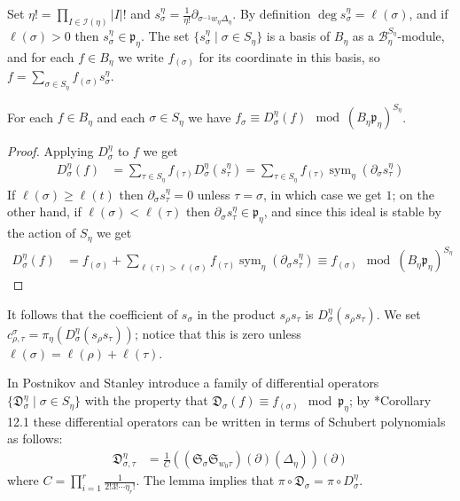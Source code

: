 \documentclass[11pt,fleqn]{article}
\newcommand\B{\mathcal B}
\newcommand\DD{\mathfrak D}
\newcommand\I{\mathcal I}
\newcommand\p{\mathfrak p}
\DeclareMathOperator\sym{sym}
\begin{document}
Set $\eta! = \prod_{I \in \I(\eta)} |I|!$ and $s^\eta_\sigma = \frac{1}{\eta!}
\partial_{\sigma^{-1} w_\eta \Delta_\eta}$. By definition $\deg s^\eta_\sigma
= \ell(\sigma)$, and if $\ell(\sigma) > 0$ then $s_\sigma^\eta \in \p_\eta$.
The set $\{s^\eta_\sigma \mid \sigma \in S_\eta\}$ is a basis of $B_\eta$ as a 
$\B_\eta^{S_\eta}$-module, and for each $f \in B_\eta$ we write $f_{(\sigma)}$
for its coordinate in this basis, so $f = \sum_{\sigma \in S_\eta} f_{(\sigma)}
s_\sigma^\eta$.

\begin{Lemma}
\label{L:schubert-basis}
For each $f \in B_\eta$ and each $\sigma \in S_\eta$ we have $f_{\sigma}
\equiv D_{\sigma}^\eta(f) \mod (B_\eta\p_\eta)^{S_\eta}$.
\end{Lemma}
\begin{proof}
Applying $D^\eta_\sigma$ to $f$ we get
\begin{align*}
D^\eta_\sigma(f) 
	&= \sum_{\tau \in S_\eta} f_{(\tau)} D^\eta_\sigma(s_\tau^\eta)
	= \sum_{\tau \in S_\eta} 
		f_{(\tau)} \sym_\eta (\partial_\sigma s_{\tau}^\eta)
\end{align*}
If $\ell(\sigma) \geq \ell(t)$ then $\partial_\sigma s_\tau^\eta = 0$ unless
$\tau = \sigma$, in which case we get $1$; on the other hand, if 
$\ell(\sigma) < \ell(\tau)$ then $\partial_\sigma s_\tau^\eta \in \p_\eta$,
and since this ideal is stable by the action of $S_\eta$ we get
\begin{align*}
D_\sigma^\eta(f) 
	&= f_{(\sigma)} + \sum_{\ell(\tau) > \ell(\sigma)} 
		f_{(\tau)} \sym_\eta (\partial_\sigma s^\eta_\tau) 
		\equiv f_{(\sigma)} \mod (B_\eta\p_\eta)^{S_\eta}
\end{align*}
\end{proof}
It follows that the coefficient of $s_\sigma$ in the product $s_\rho s_\tau$
is $D_\sigma^\eta(s_\rho s_\tau)$. We set $c^\sigma_{\rho, \tau} = 
\pi_\eta(D_\sigma^\eta(s_\rho s_\tau))$; notice that this is zero unless
$\ell(\sigma) = \ell(\rho) + \ell(\tau)$.

In \cite{PS-chains-bruhat} Postnikov and Stanley introduce a family of
differential operators $\{\DD_\sigma^\eta \mid \sigma \in S_\eta\}$ with the
property that $\DD_\sigma(f) \equiv f_{(\sigma)} \mod \p_\eta$; by 
\cite{PS-chains-bruhat}*{Corollary 12.1} these differential operators can 
be written in terms of Schubert polynomials as follows:
\begin{align*}
\DD_{\sigma, \tau}^\eta 
	&= \frac{1}{C}
		((\mathfrak S_{\sigma}\mathfrak S_{w_0\tau})(\partial)
			(\Delta_\eta))(\partial)
\end{align*}
where $C = \prod_{i=1}^r \frac{1}{2! 3! \cdots \eta_r !}$. The lemma 
implies that $\pi \circ \DD_\sigma = \pi \circ D_\sigma^\eta$. 
\end{document}
